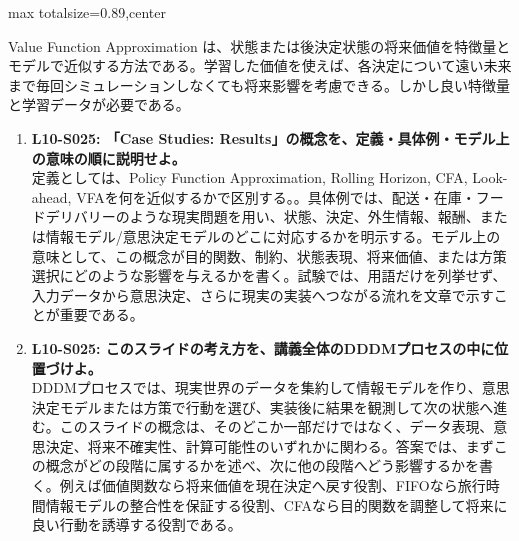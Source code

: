 \begin{minipage}[t]{0.58\textwidth}
\begin{adjustbox}{max totalsize={\textwidth}{0.89\textheight},center}
\begin{minipage}{\textwidth}
Value Function Approximation は、状態または後決定状態の将来価値を特徴量とモデルで近似する方法である。学習した価値を使えば、各決定について遠い未来まで毎回シミュレーションしなくても将来影響を考慮できる。しかし良い特徴量と学習データが必要である。\par{}\begin{enumerate}\item \textbf{L10-S025: 「Case Studies: Results」の概念を、定義・具体例・モデル上の意味の順に説明せよ。}\\定義としては、Policy Function Approximation, Rolling Horizon, CFA, Look-ahead, VFAを何を近似するかで区別する。。具体例では、配送・在庫・フードデリバリーのような現実問題を用い、状態、決定、外生情報、報酬、または情報モデル/意思決定モデルのどこに対応するかを明示する。モデル上の意味として、この概念が目的関数、制約、状態表現、将来価値、または方策選択にどのような影響を与えるかを書く。試験では、用語だけを列挙せず、入力データから意思決定、さらに現実の実装へつながる流れを文章で示すことが重要である。\item \textbf{L10-S025: このスライドの考え方を、講義全体のDDDMプロセスの中に位置づけよ。}\\DDDMプロセスでは、現実世界のデータを集約して情報モデルを作り、意思決定モデルまたは方策で行動を選び、実装後に結果を観測して次の状態へ進む。このスライドの概念は、そのどこか一部だけではなく、データ表現、意思決定、将来不確実性、計算可能性のいずれかに関わる。答案では、まずこの概念がどの段階に属するかを述べ、次に他の段階へどう影響するかを書く。例えば価値関数なら将来価値を現在決定へ戻す役割、FIFOなら旅行時間情報モデルの整合性を保証する役割、CFAなら目的関数を調整して将来に良い行動を誘導する役割である。\end{enumerate}
\end{minipage}
\end{adjustbox}
\end{minipage}


